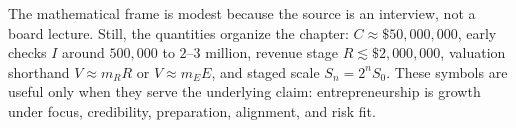 The mathematical frame is modest because the source is an interview, not a board lecture. Still, the quantities organize the chapter: \(C \approx \$50{,}000{,}000\), early checks \(I\) around $500{,}000$ to $2$--$3$ million, revenue stage \(R \lesssim \$2{,}000{,}000\), valuation shorthand \(V \approx m_RR\) or \(V \approx m_EE\), and staged scale \(S_n=2^nS_0\). These symbols are useful only when they serve the underlying claim: entrepreneurship is growth under focus, credibility, preparation, alignment, and risk fit.